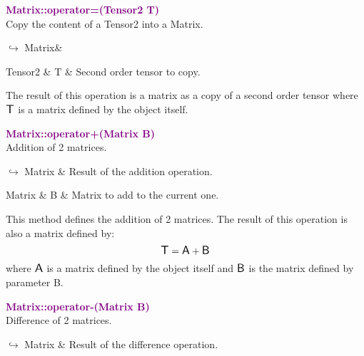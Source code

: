 \textcolor{purple}{\textbf{Matrix::operator=(Tensor2 T)}}\label{Matrix::operator=(Tensor2 T)}\\
Copy the content of a Tensor2 into a Matrix.\vspace*{-0.5em}
\begin{tcolorbox}[grow to left by=-1cm, width=\textwidth-1cm,myArgs,tabularx={l|R}]
$\hookrightarrow$ Matrix&
\end{tcolorbox}

\begin{tcolorbox}[width=\textwidth,myArgs,tabularx={ll|R}]
Tensor2 & T & Second order tensor to copy.
\end{tcolorbox}

The result of this operation is a matrix as a copy of a second order tensor where $\mbox{\large\ensuremath{\mathsf{T}}}$ is a matrix defined by the object itself.

\textcolor{purple}{\textbf{Matrix::operator+(Matrix B)}}\label{Matrix::operator+(Matrix B)}\\
Addition of 2 matrices.\vspace*{-0.5em}
\begin{tcolorbox}[grow to left by=-1cm, width=\textwidth-1cm,myArgs,tabularx={l|R}]
$\hookrightarrow$ Matrix & Result of the addition operation.
\end{tcolorbox}

\begin{tcolorbox}[width=\textwidth,myArgs,tabularx={ll|R}]
Matrix & B & Matrix to add to the current one.
\end{tcolorbox}

This method defines the addition of 2 matrices.
The result of this operation is also a matrix defined by:
\begin{equation*}
\mbox{\large\ensuremath{\mathsf{T}}} = \mbox{\large\ensuremath{\mathsf{A}}} + \mbox{\large\ensuremath{\mathsf{B}}}
\end{equation*}
where $\mbox{\large\ensuremath{\mathsf{A}}}$ is a matrix defined by the object itself and $\mbox{\large\ensuremath{\mathsf{B}}}$ is the matrix defined by parameter B.

\textcolor{purple}{\textbf{Matrix::operator-(Matrix B)}}\label{Matrix::operator-(Matrix B)}\\
Difference of 2 matrices.\vspace*{-0.5em}
\begin{tcolorbox}[grow to left by=-1cm, width=\textwidth-1cm,myArgs,tabularx={l|R}]
$\hookrightarrow$ Matrix & Result of the difference operation.
\end{tcolorbox}

